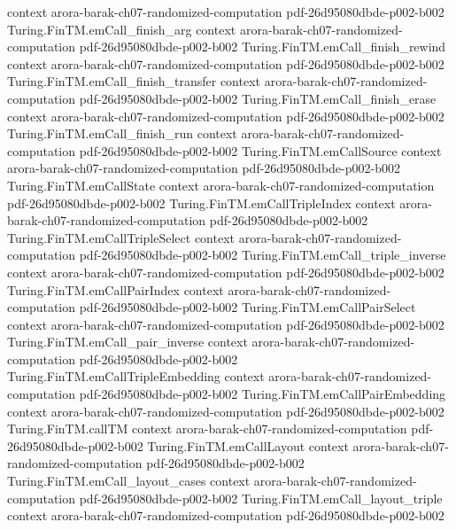 \begin{theorem}
  {context}
  {arora-barak-ch07-randomized-computation}
  {pdf-26d95080dbde-p002-b002}
\proofstep
  {Turing.FinTM.emCall_finish_arg}
  {context}
  {arora-barak-ch07-randomized-computation}
  {pdf-26d95080dbde-p002-b002}
\proofstep
  {Turing.FinTM.emCall_finish_rewind}
  {context}
  {arora-barak-ch07-randomized-computation}
  {pdf-26d95080dbde-p002-b002}
\proofstep
  {Turing.FinTM.emCall_finish_transfer}
  {context}
  {arora-barak-ch07-randomized-computation}
  {pdf-26d95080dbde-p002-b002}
\proofstep
  {Turing.FinTM.emCall_finish_erase}
  {context}
  {arora-barak-ch07-randomized-computation}
  {pdf-26d95080dbde-p002-b002}
\proofstep
  {Turing.FinTM.emCall_finish_run}
  {context}
  {arora-barak-ch07-randomized-computation}
  {pdf-26d95080dbde-p002-b002}
\proofstep
  {Turing.FinTM.emCallSource}
  {context}
  {arora-barak-ch07-randomized-computation}
  {pdf-26d95080dbde-p002-b002}
\proofstep
  {Turing.FinTM.emCallState}
  {context}
  {arora-barak-ch07-randomized-computation}
  {pdf-26d95080dbde-p002-b002}
\proofstep
  {Turing.FinTM.emCallTripleIndex}
  {context}
  {arora-barak-ch07-randomized-computation}
  {pdf-26d95080dbde-p002-b002}
\proofstep
  {Turing.FinTM.emCallTripleSelect}
  {context}
  {arora-barak-ch07-randomized-computation}
  {pdf-26d95080dbde-p002-b002}
\proofstep
  {Turing.FinTM.emCall_triple_inverse}
  {context}
  {arora-barak-ch07-randomized-computation}
  {pdf-26d95080dbde-p002-b002}
\proofstep
  {Turing.FinTM.emCallPairIndex}
  {context}
  {arora-barak-ch07-randomized-computation}
  {pdf-26d95080dbde-p002-b002}
\proofstep
  {Turing.FinTM.emCallPairSelect}
  {context}
  {arora-barak-ch07-randomized-computation}
  {pdf-26d95080dbde-p002-b002}
\proofstep
  {Turing.FinTM.emCall_pair_inverse}
  {context}
  {arora-barak-ch07-randomized-computation}
  {pdf-26d95080dbde-p002-b002}
\proofstep
  {Turing.FinTM.emCallTripleEmbedding}
  {context}
  {arora-barak-ch07-randomized-computation}
  {pdf-26d95080dbde-p002-b002}
\proofstep
  {Turing.FinTM.emCallPairEmbedding}
  {context}
  {arora-barak-ch07-randomized-computation}
  {pdf-26d95080dbde-p002-b002}
\proofstep
  {Turing.FinTM.callTM}
  {context}
  {arora-barak-ch07-randomized-computation}
  {pdf-26d95080dbde-p002-b002}
\proofstep
  {Turing.FinTM.emCallLayout}
  {context}
  {arora-barak-ch07-randomized-computation}
  {pdf-26d95080dbde-p002-b002}
\proofstep
  {Turing.FinTM.emCall_layout_cases}
  {context}
  {arora-barak-ch07-randomized-computation}
  {pdf-26d95080dbde-p002-b002}
\proofstep
  {Turing.FinTM.emCall_layout_triple}
  {context}
  {arora-barak-ch07-randomized-computation}
  {pdf-26d95080dbde-p002-b002}

\end{theorem}
